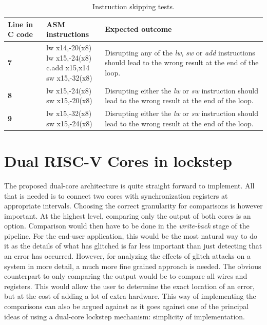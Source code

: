 \begin{table}[h]
\centering
\caption{Instruction skipping tests.}
\label{tab:coverage_test}
\begin{tabular}{m{2.5cm}m{3.5cm}m{7.5cm}}
\toprule 
Line in C code & ASM instructions & Expected outcome \\
\midrule
\rowcolor{black!20} \textbf{7} & \makecell{lw	x14,-20(x8) \\ lw x15,-24(x8) \\ c.add x15,x14 \\ sw x15,-32(x8)} & Disrupting any of the \textit{lw}, \textit{sw} or \textit{add} instructions should lead to the wrong result at the end of the loop.\\
\textbf{8} & \makecell{lw x15,-24(x8) \\ sw x15,-20(x8)} & Disrupting either the \textit{lw} or \textit{sw} instruction should lead to the wrong result at the end of the loop. \\
\rowcolor{black!20} \textbf{9} & \makecell{lw x15,-32(x8) \\ sw x15,-24(x8)} & Disrupting either the \textit{lw} or \textit{sw} instruction should lead to the wrong result at the end of the loop.\\
\bottomrule
\end{tabular}
\end{table}

\section{Dual RISC-V Cores in lockstep}
\label{sec:dualcore}

The proposed dual-core architecture is quite straight forward to implement. All that is needed is to connect two cores with synchronization registers at appropriate intervals. Choosing the correct granularity for comparisons is however important. At the highest level, comparing only the output of both cores is an option. Comparison would then have to be done in the \textit{write-back} stage of the pipeline. For the end-user application, this would be the most natural way to do it as the details of what has glitched is far less important than just detecting that an error has occurred. However, for analyzing the effects of glitch attacks on a system in more detail, a much more fine grained approach is needed. The obvious counterpart to only comparing the output would be to compare all wires and registers. This would allow the user to determine the exact location of an error, but at the cost of adding a lot of extra hardware. This way of implementing the comparisons can also be argued against as it goes against one of the principal ideas of using a dual-core lockstep mechanism: simplicity of implementation. 

